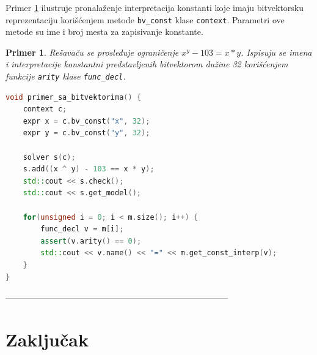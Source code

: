 \documentclass[12pt,oneside]{memoir}
\newtheorem{primer}{Primer}
\begin{document}
Primer \ref{ex6} ilustruje pronalaženje interpretacija konstanti koje imaju bitvektorsku reprezentaciju korišćenjem metode \texttt{bv\_const} klase \texttt{context}. Parametri ove metode su ime i broj mesta za zapisivanje konstante. 
\begin{primer} \label{ex6} 
Rešavaču se prosleđuje ograničenje $x^y - 103 = x*y$. 
Ispisuju se imena i interpretacije konstantni predstavljenih bitvektorom dužine 32 korišćenjem funkcije \texttt{arity} klase \texttt{func\_decl}.
\begin{lstlisting}[language=C++]
void primer_sa_bitvektorima() {
    context c;
    expr x = c.bv_const("x", 32);
    expr y = c.bv_const("y", 32);

    solver s(c);
    s.add((x ^ y) - 103 == x * y);
    std::cout << s.check();
    std::cout << s.get_model();
    
    for(unsigned i = 0; i < m.size(); i++) {
        func_decl v = m[i];
        assert(v.arity() == 0); 
        std::cout << v.name() << "=" << m.get_const_interp(v);
    }
}

\end{lstlisting}
\end{primer}



------------------------------------------------------------------------------

\chapter{Zaključak}


\literatura

\backmatter

\end{document}
